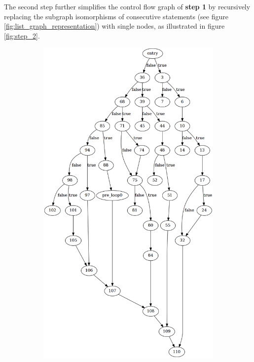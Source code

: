 The second step further simplifies the control flow graph of \textbf{step 1} by recursively replacing the subgraph isomorphisms of consecutive statements (see figure \ref{fig:list_graph_representation}) with single nodes, as illustrated in figure \ref{fig:step_2}.

\begin{figure}[htbp]
	\centering
	\begin{subfigure}[t]{0.45\textwidth}
		\includegraphics[width=\textwidth]{appendices/stmt_example/stmt_1.png}

\end{subfigure}
\end{figure}
